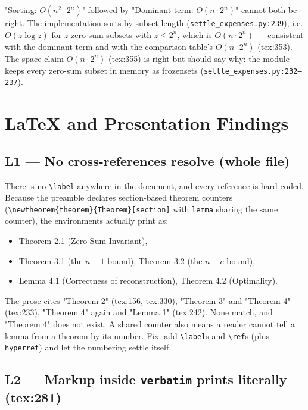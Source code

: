 \documentclass[11pt]{article}
\begin{document}
"Sorting: $O(n^2 \cdot 2^n)$" followed by "Dominant term: $O(n \cdot 2^n)$" cannot both be right. The
implementation sorts by subset length (\texttt{settle\_expenses.py:239}), i.e. $O(z \log z)$ for $z$
zero-sum subsets with $z \le 2^n$, which is $O(n \cdot 2^n)$ --- consistent with the dominant term and with
the comparison table's $O(n \cdot 2^n)$ (tex:353). The space claim $O(n \cdot 2^n)$ (tex:355) is right
but should say why: the module keeps every zero-sum subset in memory as frozensets
(\texttt{settle\_expenses.py:232--237}).

\section{LaTeX and Presentation Findings}

\subsection{L1 --- No cross-references resolve (whole file)}

There is no \texttt{\textbackslash label} anywhere in the document, and every reference is hard-coded.
Because the preamble declares section-based theorem counters
(\texttt{\textbackslash newtheorem\{theorem\}\{Theorem\}[section]} with \texttt{lemma} sharing the same
counter), the environments actually print as:

\begin{itemize}
  \item Theorem 2.1 (Zero-Sum Invariant),
  \item Theorem 3.1 (the $n-1$ bound), Theorem 3.2 (the $n-c$ bound),
  \item Lemma 4.1 (Correctness of reconstruction), Theorem 4.2 (Optimality).
\end{itemize}

The prose cites "Theorem 2" (tex:156, tex:330), "Theorem 3" and "Theorem 4" (tex:233), "Theorem 4"
again and "Lemma 1" (tex:242). None match, and "Theorem 4" does not exist. A shared counter also means a
reader cannot tell a lemma from a theorem by its number. Fix: add \texttt{\textbackslash label}s and
\texttt{\textbackslash ref}s (plus \texttt{hyperref}) and let the numbering settle itself.

\subsection{L2 --- Markup inside \texttt{verbatim} prints literally (tex:281)}
\end{document}
